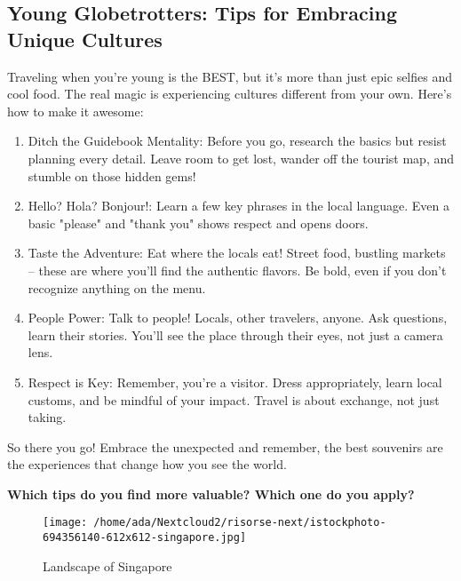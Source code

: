 \documentclass[]{article} %
\begin{document}
	\subsection*{Young Globetrotters: Tips for Embracing Unique Cultures}
	
	
	Traveling when you're young is the BEST, but it's more than just epic selfies and cool food. The real magic is experiencing cultures different from your own. Here's how to make it awesome:
	\begin{enumerate}
		
		\item{ Ditch the Guidebook Mentality: Before you go, research the basics but resist planning every detail. Leave room to get lost, wander off the tourist map, and stumble on those hidden gems!}
		\item{ Hello? Hola? Bonjour!: Learn a few key phrases in the local language. Even a basic "please" and "thank you" shows respect and opens doors.}
		\item{ Taste the Adventure: Eat where the locals eat! Street food, bustling markets – these are where you'll find the authentic flavors. Be bold, even if you don't recognize anything on the menu.}
		\item{ People Power: Talk to people! Locals, other travelers, anyone. Ask questions, learn their stories. You'll see the place through their eyes, not just a camera lens.}
		\item{ Respect is Key: Remember, you're a visitor. Dress appropriately, learn local customs, and be mindful of your impact. Travel is about exchange, not just taking.}
	\end{enumerate}
	
	
	So there you go! Embrace the unexpected and remember, the best souvenirs are the experiences that change how you see the world.
	\vspace{1cm}
	\begin{question}
		\textbf{Which tips do you find more valuable? Which one do you apply?}
	\end{question}
	
	\vspace{4cm}
	
	\begin{figure}[htb]
		\centering
		\texttt{[image: /home/ada/Nextcloud2/risorse-next/istockphoto-694356140-612x612-singapore.jpg]}
		\caption {Landscape of Singapore}
	\end{figure}
	
	
\end{document}
